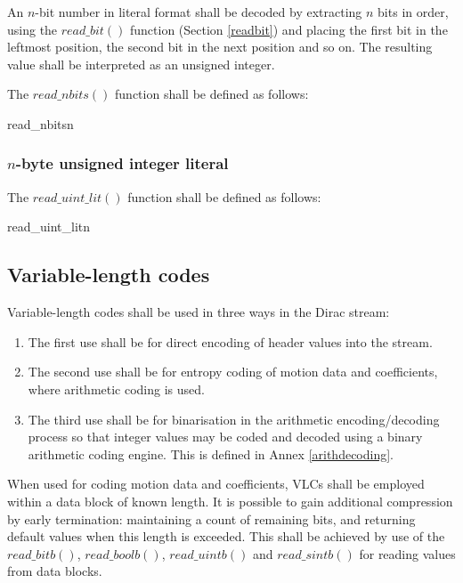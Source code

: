 An $n$-bit number in literal format shall be decoded by extracting $n$ bits
in order, using the $read\_bit()$ function (Section \ref{readbit})
 and placing the first bit in the leftmost position, the second
bit in the next position and so on. The resulting value shall be
interpreted as an unsigned integer.

The $read\_nbits()$ function shall be defined as follows:

\begin{pseudo}{read\_nbits}{n}
\bsEND
{}
\end{pseudo}

\subsubsection{$n$-byte unsigned integer literal}

The $read\_uint\_lit()$ function shall be defined as follows:

\begin{pseudo}{read\_uint\_lit}{n}
\end{pseudo}

\subsection{Variable-length codes}
\label{vlc}
Variable-length codes shall be used in three ways in the Dirac stream:
\begin{enumerate}
\item The first use shall be for direct encoding of header values into the stream. 
\item The second use shall be for entropy coding of motion data and coefficients, where arithmetic coding
is used.
\item The third use shall be for binarisation in the arithmetic encoding/decoding process so that integer 
values may be coded and decoded using a binary arithmetic coding engine. This is
defined in Annex \ref{arithdecoding}.
\end{enumerate}

When used for coding motion data and coefficients, VLCs shall be employed within
a data block of known length. It is possible to gain additional compression by early termination:
maintaining a count of remaining bits, and returning default values when this length
is exceeded. This shall be achieved by use of the $read\_bitb()$, $read\_boolb()$, 
$read\_uintb()$ and $read\_sintb()$ for reading values from data blocks. 


